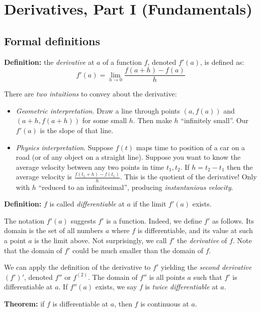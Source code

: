 
\section{Derivatives, Part I (Fundamentals)}

\subsection{Formal definitions}

\textbf{Definition:} the \textit{derivative} at $a$ of a function $f$,
denoted $f'(a)$, is defined as:
\[f'(a)=\lim_{h\to0}\frac{f(a+h)-f(a)}{h}\]

There are \textit{two intuitions} to convey about the derivative:
\begin{itemize}
\item \textit{Geometric interpretation}. Draw a line through points
  $(a, f(a))$ and $(a+h, f(a+h))$ for some small $h$. Then make $h$
  ``infinitely small''. Our $f'(a)$ is the slope of that line.
\item \textit{Physics interpretation}. Suppose $f(t)$ maps time to
  position of a car on a road (or of any object on a straight line).
  Suppose you want to know the average velocity between any two points
  in time $t_1, t_2$. If $h=t_2-t_1$ then the average velocity is
  $\frac{f(t_1+h)-f(t_1)}{h}$. This is the quotient of the derivative!
  Only with $h$ ``reduced to an infinitesimal'', producing
  \textit{instantanious velocity}.
\end{itemize}

\textbf{Definition:} $f$ is called \textit{differentiable} at $a$ if
the limit $f'(a)$ exists.

\vs

The notation $f'(a)$ suggests $f'$ is a function. Indeed, we define
$f'$ as follows. Its domain is the set of all numbers $a$ where $f$ is
differentiable, and its value at such a point $a$ is the limit above.
Not surprisingly, we call $f'$ the \textit{derivative} of $f$. Note
that the domain of $f'$ could be much smaller than the domain of $f$.

\vs

We can apply the definition of the derivative to $f'$ yielding the
\textit{second derivative} $(f')'$, denoted $f''$ or $f^{(2)}$. The
domain of $f''$ is all points $a$ such that $f'$ is differentiable at
$a$. If $f''(a)$ exists, we say $f$ is \textit{twice differentiable}
at $a$.

\vs

\textbf{Theorem:} if $f$ is differentiable at $a$, then $f$ is
continuous at $a$.

